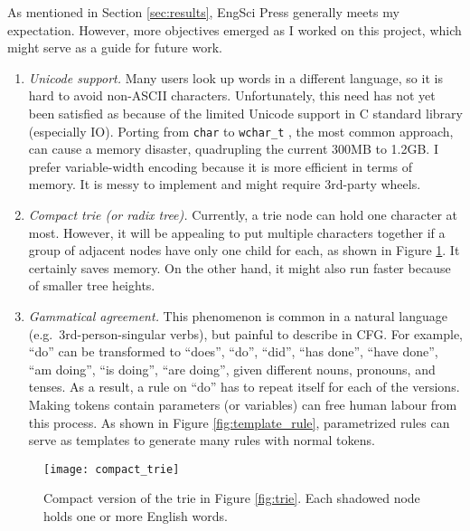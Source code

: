 \documentclass[../main.tex]{subfiles}
\begin{document}
As mentioned in Section \ref{sec:results}, EngSci Press generally meets my expectation. However, more objectives emerged as I worked on this project, which might serve as a guide for future work.

\begin{enumerate}
	\item \textit{Unicode support.}
	Many users look up words in a different language, so it is hard to avoid non-ASCII characters. Unfortunately, this need has not yet been satisfied as because of the limited Unicode support \cite{bib:c_unicode} in C standard library (especially IO). Porting from \texttt{char} to \texttt{wchar\_t} \cite{bib:wchar_t}, the most common approach, can cause a memory disaster, quadrupling the current 300MB to 1.2GB. I prefer variable-width encoding because it is more efficient in terms of memory. It is messy to implement and might require 3rd-party wheels.
	
	\item \textit{Compact trie (or radix tree).}
	Currently, a trie node can hold one character at most. However, it will be appealing to put multiple characters together if a group of adjacent nodes have only one child for each, as shown in Figure \ref{fig:compact_trie}. It certainly saves memory. On the other hand, it might also run faster because of smaller tree heights.
	
	\item \textit{Gammatical agreement.}
	This phenomenon is common in a natural language (e.g.\ 3rd-person-singular verbs), but painful to describe in CFG. For example, ``do'' can be transformed to ``does'', ``do'', ``did'', ``has done'', ``have done'', ``am doing'', ``is doing'', ``are doing'', given different nouns, pronouns, and tenses. As a result, a rule on ``do'' has to repeat itself for each of the versions. Making tokens contain parameters (or variables) \cite{bib:context_free_grammar} can free human labour from this process. As shown in Figure \ref{fig:template_rule}, parametrized rules can serve as templates to generate many rules with normal tokens.
\end{enumerate}

\begin{figure}
	\centering
	\texttt{[image: compact\_trie]}
	\caption{Compact version of the trie in Figure \ref{fig:trie}. Each shadowed node holds one or more English words.}
	\label{fig:compact_trie}
\end{figure}
\end{document}
